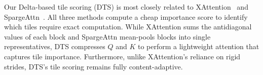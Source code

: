 Our Delta-based tile scoring (DTS) is most closely related to XAttention~\cite{xu2025xattention} and SpargeAttn~\cite{zhang2025spargeattn}. All three methods compute a cheap importance score to identify which tiles require exact computation. While XAttention sums the antidiagonal values of each block and SpargeAttn mean-pools blocks into single representatives, DTS compresses $Q$ and $K$ to perform a lightweight attention that captures tile importance. Furthermore, unlike XAttention's reliance on rigid strides, DTS's tile scoring remains fully content-adaptive.
